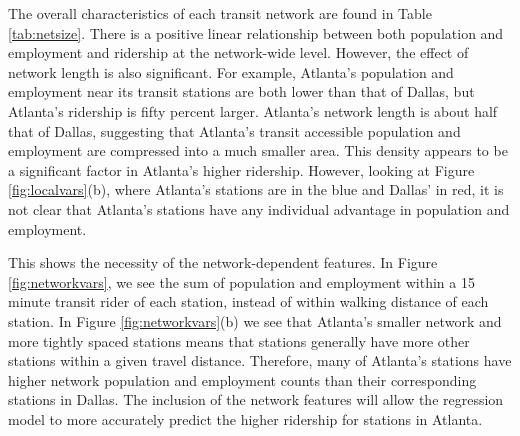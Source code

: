 \documentclass[11pt]{article}
\begin{document}
The overall characteristics of each transit network are found in Table \ref{tab:netsize}. There is a positive linear relationship between both population and employment and ridership at the network-wide level. However, the effect of network length is also significant. For example, Atlanta's population and employment near its transit stations are both lower than that of Dallas, but Atlanta's ridership is fifty percent larger. Atlanta's network length is about half that of Dallas, suggesting that Atlanta's transit accessible population and employment are compressed into a much smaller area. This density appears to be a significant factor in Atlanta's higher ridership. However, looking at Figure \ref{fig:localvars}(b), where Atlanta's stations are in the blue and Dallas' in red, it is not clear that Atlanta's stations have any individual advantage in population and employment. 

This shows the necessity of the network-dependent features. In Figure \ref{fig:networkvars}, we see the sum of population and employment within a 15 minute transit rider of each station, instead of within walking distance of each station. In Figure \ref{fig:networkvars}(b) we see that Atlanta's smaller network and more tightly spaced stations means that stations generally have more other stations within a given travel distance. Therefore, many of Atlanta's stations have higher network population and employment counts than their corresponding stations in Dallas. The inclusion of the network features will allow the regression model to more accurately predict the higher ridership for stations in Atlanta. 
\end{document}
